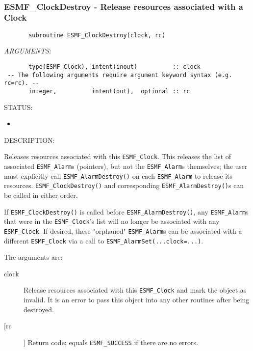  
\mbox{}\hrulefill\ 
 
\subsubsection [ESMF\_ClockDestroy] {ESMF\_ClockDestroy - Release resources associated with a Clock}


  
\begin{verbatim}       subroutine ESMF_ClockDestroy(clock, rc)\end{verbatim}{\em ARGUMENTS:}
\begin{verbatim}       type(ESMF_Clock), intent(inout)          :: clock
 -- The following arguments require argument keyword syntax (e.g. rc=rc). --
       integer,          intent(out),  optional :: rc\end{verbatim}
{\sf STATUS:}
   \begin{itemize}
   \item{}
   \end{itemize}
  
{\sf DESCRIPTION:\\ }


       \begin{sloppypar}
       Releases resources associated with this {\tt ESMF\_Clock}.  This releases
       the list of associated {\tt ESMF\_Alarm}s (pointers), but not the
       {\tt ESMF\_Alarm}s themselves; the user must explicitly call
       {\tt ESMF\_AlarmDestroy()} on each {\tt ESMF\_Alarm} to release its
       resources.  {\tt ESMF\_ClockDestroy()} and corresponding
       {\tt ESMF\_AlarmDestroy()}s can be called in either order.
       \end{sloppypar}
  
       \begin{sloppypar}
       If {\tt ESMF\_ClockDestroy()} is called before {\tt ESMF\_AlarmDestroy()},
       any {\tt ESMF\_Alarm}s that were in the {\tt ESMF\_Clock}'s list will
       no longer be associated with any {\tt ESMF\_Clock}.  If desired,
       these "orphaned" {\tt ESMF\_Alarm}s can be associated with a different
       {\tt ESMF\_Clock} via a call to {\tt ESMF\_AlarmSet(...clock=...)}.
       \end{sloppypar}
  
       The arguments are:
       \begin{description}
       \item[clock]
         Release resources associated with this {\tt ESMF\_Clock} and mark the
         object as invalid.  It is an error to pass this object into any other
         routines after being destroyed.
       \item[[rc]]
         Return code; equals {\tt ESMF\_SUCCESS} if there are no errors.
       \end{description}
   
